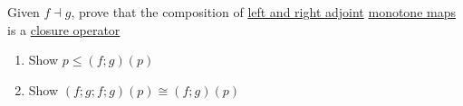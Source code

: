
Given $f \dashv g$, prove that the composition of \href{doc/1 math/Seven Sketches in Compositionality/Chapter 1: Generative Effects/6 Galois connections/1 Definition and examples/Galois connection}{left and right adjoint} \href{doc/1 math/Seven Sketches in Compositionality/Chapter 1: Generative Effects/4 Monotone maps/1 Monotone map}{monotone maps} is a \href{doc/1 math/Seven Sketches in Compositionality/Chapter 1: Generative Effects/6 Galois connections/4 Closure operators/1 Closure operator}{closure operator}
    \begin{enumerate}
      \item Show $p \leq (f;g)(p)$
      \item Show $(f;g;f;g)(p) \cong (f;g)(p)$
    \end{enumerate}